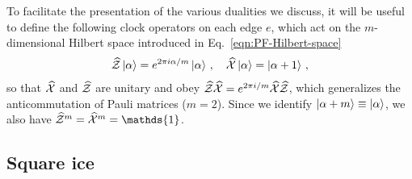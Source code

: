 To facilitate the presentation of the various dualities we discuss,
it will be useful to define the following clock operators on each edge $e$, which act on the $m$-dimensional Hilbert space introduced in Eq.~\eqref{eqn:PF-Hilbert-space}
%
%
\begin{align}
    \hat{\cal{Z}} \ket{\alpha} = e^{2\pi i \alpha/m}\ket{\alpha} \, ,
    \quad
    \hat{\cal{X}} \ket{\alpha} = \ket{\alpha+1} \, ,
    \label{eqn:generalized-pauli-defs}
\end{align}
%
%
so that $\hat{\cal{X}}$ and $\hat{\cal{Z}}$ are unitary and obey $\hat{\cal{Z}}\hat{\cal{X}} = e^{2\pi i /m} \hat{\cal{X}}\hat{\cal{Z}}$, which generalizes the anticommutation of Pauli matrices ($m=2$). Since we identify $\ket{\alpha+m} \equiv \ket{\alpha}$, we also have $\hat{\cal{Z}}^m = \hat{\cal{X}}^m = \mathds{1}$.


\subsection{Square ice} \label{sub:square-ice}

